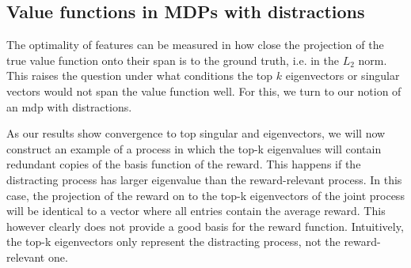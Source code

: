 \subsection{Value functions in MDPs with distractions}
\label{app:distraction_motivation}

The optimality of features can be measured in how close the projection of the true value function onto their span is to the ground truth, i.e. in the $L_2$ norm.
This raises the question under what conditions the top $k$ eigenvectors or singular vectors would not span the value function well.
For this, we turn to our notion of an \ac{mdp} with distractions.

As our results show convergence to top singular and eigenvectors, we will now construct an example of a process in which the top-k eigenvalues will contain redundant copies of the basis function of the reward.
This happens if the distracting process has larger eigenvalue than the reward-relevant process.
In this case, the projection of the reward on to the top-k eigenvectors of the joint process will be identical to a vector where all entries contain the average reward.
This however clearly does not provide a good basis for the reward function.
Intuitively, the top-k eigenvectors only represent the distracting process, not the reward-relevant one.


